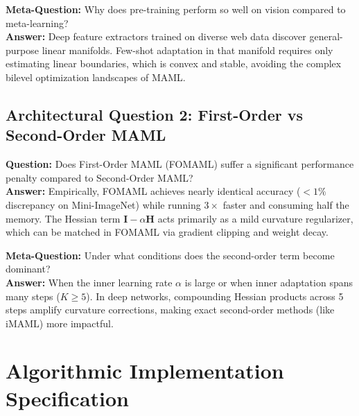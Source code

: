 \documentclass[11pt,a4paper]{article}
\theoremstyle{definition}
\begin{document}
\textbf{Meta-Question:} Why does pre-training perform so well on vision compared to meta-learning?\\
\textbf{Answer:} Deep feature extractors trained on diverse web data discover general-purpose linear manifolds. Few-shot adaptation in that manifold requires only estimating linear boundaries, which is convex and stable, avoiding the complex bilevel optimization landscapes of MAML.

\subsection{Architectural Question 2: First-Order vs Second-Order MAML}
\textbf{Question:} Does First-Order MAML (FOMAML) suffer a significant performance penalty compared to Second-Order MAML?\\
\textbf{Answer:} Empirically, FOMAML achieves nearly identical accuracy ($< 1\%$ discrepancy on Mini-ImageNet) while running $3\times$ faster and consuming half the memory. The Hessian term $\mathbf{I} - \alpha \mathbf{H}$ acts primarily as a mild curvature regularizer, which can be matched in FOMAML via gradient clipping and weight decay.

\textbf{Meta-Question:} Under what conditions does the second-order term become dominant?\\
\textbf{Answer:} When the inner learning rate $\alpha$ is large or when inner adaptation spans many steps ($K \ge 5$). In deep networks, compounding Hessian products across 5 steps amplify curvature corrections, making exact second-order methods (like iMAML) more impactful.

\section{Algorithmic Implementation Specification}
\end{document}

